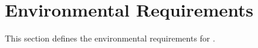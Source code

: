 \KNEADSECTIONNEWPAGE
\section{Environmental Requirements}
\label{lab:sec_Environmental}
% 

This section defines the environmental requirements for \ThisSys.

